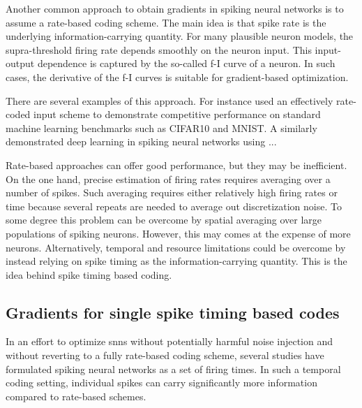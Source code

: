 \documentclass[journal,onecolumn,11pt]{IEEEtran}
\begin{document}
Another common approach to obtain gradients in spiking neural networks is to
assume a rate-based coding scheme.
The main idea is that spike rate is the underlying information-carrying quantity.
For many plausible neuron models, the supra-threshold firing rate depends
smoothly on the neuron input. This input-output dependence is captured by the
so-called f-I curve of a neuron.
In such cases, the derivative of the f-I curves is suitable for gradient-based optimization. 


There are several examples of this approach. 
For instance \citet{Hunsberger_Eliasmith15_spikdeep} used an effectively
rate-coded input scheme to demonstrate competitive performance on standard
machine learning benchmarks such as CIFAR10 and MNIST.
A similarly \cite{Lee_etal16_traideep} demonstrated deep learning in spiking
neural networks using ... %

Rate-based approaches can offer good performance, but they may be inefficient.
On the one hand, precise estimation of firing rates requires averaging over
a number of spikes.  Such averaging requires either relatively high firing rates or
time because several repeats are needed to average out discretization noise.  
To some degree this problem can be overcome by spatial averaging over
large populations of spiking neurons. However, this may comes at the expense of
more neurons. 
Alternatively, temporal and resource limitations could be overcome by instead relying on
spike timing as the information-carrying quantity. This is the idea behind
spike timing based coding.


\subsection{Gradients for single spike timing based codes}

In an effort to optimize \glspl{snn} without potentially harmful noise
injection and without reverting to a fully rate-based coding scheme, 
several studies have formulated spiking neural
networks as a set of firing times.
In such a temporal coding setting, individual spikes can carry significantly more
information compared to rate-based schemes.
\end{document}
